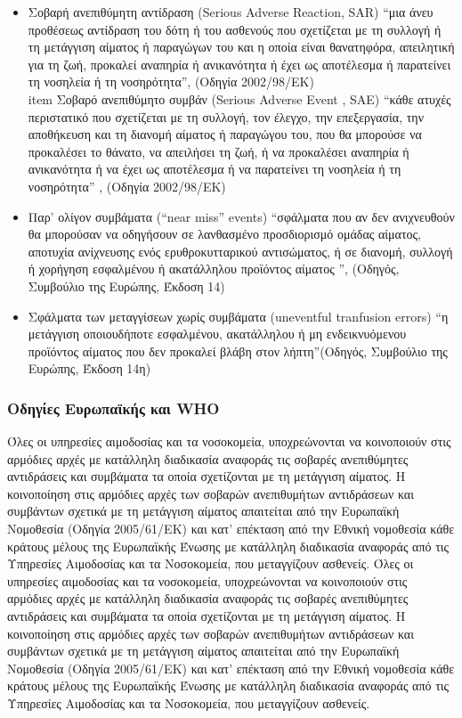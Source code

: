 		\begin{itemize}
		\item	 Σοβαρή ανεπιθύμητη αντίδραση (Serious Adverse Reaction, SAR)
		 “μια άνευ προθέσεως αντίδραση του δότη ή του ασθενούς που σχετίζεται με τη συλλογή ή τη μετάγγιση αίματος ή παραγώγων του 			και η οποία είναι θανατηφόρα, απειλητική για τη ζωή, προκαλεί αναπηρία ή ανικανότητα ή έχει ως αποτέλεσμα ή παρατείνει τη 					νοσηλεία ή τη νοσηρότητα”, (Οδηγία 2002/98/ΕΚ)
 		\\item Σοβαρό ανεπιθύμητο συμβάν (Serious Adverse Event , SAE)
 		“κάθε ατυχές περιστατικό που σχετίζεται με τη συλλογή, τον έλεγχο, την επεξεργασία, την αποθήκευση και τη διανομή αίματος ή 				παραγώγου του, που θα μπορούσε να προκαλέσει το θάνατο, να απειλήσει τη ζωή, ή να προκαλέσει αναπηρία ή ανικανότητα ή να 				έχει ως αποτέλεσμα ή να παρατείνει τη νοσηλεία ή τη νοσηρότητα” , (Οδηγία 2002/98/ΕΚ)
 		\item Παρ’ ολίγον συμβάματα (“near miss” events)
 		 “σφάλματα που αν δεν ανιχνευθούν θα μπορούσαν να οδηγήσουν σε λανθασμένο προσδιορισμό ομάδας αίματος, αποτυχία
 		 ανίχνευσης ενός ερυθροκυτταρικού αντισώματος, ή σε διανομή, συλλογή ή χορήγηση εσφαλμένου ή ακατάλληλου προϊόντος
 		 αίματος ”, (Οδηγός, Συμβούλιο της Ευρώπης, Έκδοση 14) 
 		 \item Σφάλματα των μεταγγίσεων χωρίς συμβάματα (uneventful tranfusion errors)
 		 “η μετάγγιση οποιουδήποτε εσφαλμένου, ακατάλληλου ή μη ενδεικνυόμενου προϊόντος αίματος που δεν προκαλεί βλάβη στον 					λήπτη”(Οδηγός, Συμβούλιο της Ευρώπης, Έκδοση 14η)
 		 \end{itemize} 
		\subsubsection{Οδηγίες Ευρωπαϊκής και WHO}
		Όλες οι υπηρεσίες αιμοδοσίας και τα νοσοκομεία, υποχρεώνονται να κοινοποιούν στις αρμόδιες αρχές με κατάλληλη διαδικασία αναφοράς τις σοβαρές ανεπιθύμητες αντιδράσεις 	και συμβάματα τα οποία σχετίζονται με τη μετάγγιση αίματος. Η κοινοποίηση στις αρμόδιες αρχές των σοβαρών ανεπιθυμήτων αντιδράσεων και συμβάντων σχετικά με τη μετάγγιση αίματος απαιτείται από την Ευρωπαϊκή Νομοθεσία (Οδηγία 2005/61/ΕΚ) και κατ’ επέκταση από την Εθνική νομοθεσία κάθε κράτους μέλους της Ευρωπαϊκής Ένωσης με κατάλληλη διαδικασία αναφοράς από τις Υπηρεσίες Αιμοδοσίας και τα Νοσοκομεία, που μεταγγίζουν ασθενείς.  
		Όλες οι υπηρεσίες αιμοδοσίας και τα νοσοκομεία, υποχρεώνονται να κοινοποιούν στις 		αρμόδιες αρχές με κατάλληλη διαδικασία αναφοράς τις σοβαρές ανεπιθύμητες αντιδράσεις 	και συμβάματα τα οποία σχετίζονται με τη μετάγγιση αίματος.
Η κοινοποίηση στις αρμόδιες αρχές των σοβαρών ανεπιθυμήτων αντιδράσεων και συμβάντων σχετικά με τη μετάγγιση αίματος απαιτείται από την Ευρωπαϊκή Νομοθεσία (Οδηγία 2005/61/ΕΚ) και κατ’ επέκταση από την Εθνική νομοθεσία κάθε κράτους μέλους της Ευρωπαϊκής Ένωσης με κατάλληλη διαδικασία αναφοράς από τις Υπηρεσίες Αιμοδοσίας και τα Νοσοκομεία, που μεταγγίζουν ασθενείς.
 		 

